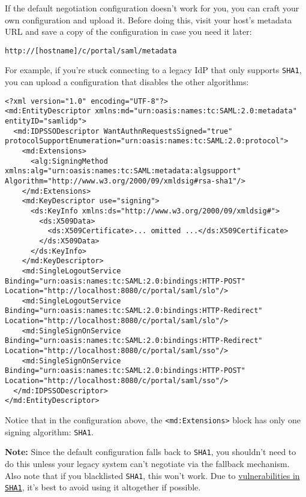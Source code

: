 If the default negotiation configuration doesn't work for you, you can
craft your own configuration and upload it. Before doing this, visit
your host's metadata URL and save a copy of the configuration in case
you need it later:

\begin{verbatim}
http://[hostname]/c/portal/saml/metadata
\end{verbatim}

For example, if you're stuck connecting to a legacy IdP that only
supports \texttt{SHA1}, you can upload a configuration that disables the
other algorithms:

\begin{verbatim}
<?xml version="1.0" encoding="UTF-8"?>
<md:EntityDescriptor xmlns:md="urn:oasis:names:tc:SAML:2.0:metadata" entityID="samlidp">
  <md:IDPSSODescriptor WantAuthnRequestsSigned="true" protocolSupportEnumeration="urn:oasis:names:tc:SAML:2.0:protocol">
    <md:Extensions>
      <alg:SigningMethod xmlns:alg="urn:oasis:names:tc:SAML:metadata:algsupport" Algorithm="http://www.w3.org/2000/09/xmldsig#rsa-sha1"/>
    </md:Extensions>
    <md:KeyDescriptor use="signing">
      <ds:KeyInfo xmlns:ds="http://www.w3.org/2000/09/xmldsig#">
        <ds:X509Data>
          <ds:X509Certificate>... omitted ...</ds:X509Certificate>
        </ds:X509Data>
      </ds:KeyInfo>
    </md:KeyDescriptor>
    <md:SingleLogoutService Binding="urn:oasis:names:tc:SAML:2.0:bindings:HTTP-POST" Location="http://localhost:8080/c/portal/saml/slo"/>
    <md:SingleLogoutService Binding="urn:oasis:names:tc:SAML:2.0:bindings:HTTP-Redirect" Location="http://localhost:8080/c/portal/saml/slo"/>
    <md:SingleSignOnService Binding="urn:oasis:names:tc:SAML:2.0:bindings:HTTP-Redirect" Location="http://localhost:8080/c/portal/saml/sso"/>
    <md:SingleSignOnService Binding="urn:oasis:names:tc:SAML:2.0:bindings:HTTP-POST" Location="http://localhost:8080/c/portal/saml/sso"/>
  </md:IDPSSODescriptor>
</md:EntityDescriptor>
\end{verbatim}

Notice that in the configuration above, the
\texttt{\textless{}md:Extensions\textgreater{}} block has only one
signing algorithm: \texttt{SHA1}.

\noindent\hrulefill

\textbf{Note:} Since the default configuration falls back to
\texttt{SHA1}, you shouldn't need to do this unless your legacy system
can't negotiate via the fallback mechanism. Also note that if you
blacklisted \texttt{SHA1}, this won't work. Due to
\href{https://en.wikipedia.org/wiki/SHA-1}{vulnerabilities in
\texttt{SHA1}}, it's best to avoid using it altogether if possible.

